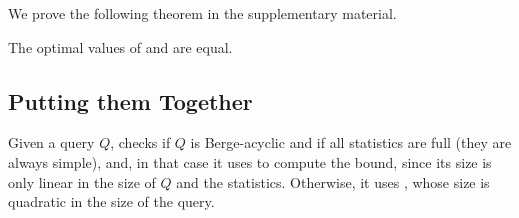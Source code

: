 We prove the following theorem in the supplementary material.
\begin{theorem} \label{th:lpbase:eq:lpflow}
    The optimal values of \lpbase and \lpflow are equal.
  \end{theorem}


\subsection{Putting them Together}

Given a query $Q$, \system checks if $Q$ is Berge-acyclic and if all
statistics are full (they are always simple), and, in that case it
uses \lptdb to compute the bound, since its size is only linear in the
size of $Q$ and the statistics.  Otherwise, it uses \lpflow, whose
size is quadratic in the size of the query.  
